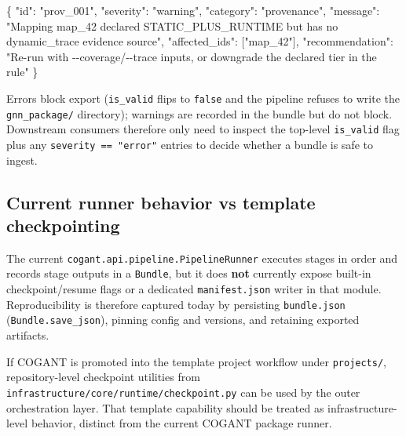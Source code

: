\documentclass[
]{article}
\newenvironment{Shaded}{}{}
\newcommand{\DataTypeTok}[1]{\textcolor[rgb]{0.56,0.13,0.00}{#1}}
\newcommand{\FunctionTok}[1]{\textcolor[rgb]{0.02,0.16,0.49}{#1}}
\newcommand{\OtherTok}[1]{\textcolor[rgb]{0.00,0.44,0.13}{#1}}
\newcommand{\StringTok}[1]{\textcolor[rgb]{0.25,0.44,0.63}{#1}}
\begin{document}
\begin{Shaded}
\begin{Highlighting}[]
\FunctionTok{\{}
  \DataTypeTok{"id"}\FunctionTok{:} \StringTok{"prov\_001"}\FunctionTok{,}
  \DataTypeTok{"severity"}\FunctionTok{:} \StringTok{"warning"}\FunctionTok{,}
  \DataTypeTok{"category"}\FunctionTok{:} \StringTok{"provenance"}\FunctionTok{,}
  \DataTypeTok{"message"}\FunctionTok{:} \StringTok{"Mapping \textquotesingle{}map\_42\textquotesingle{} declared STATIC\_PLUS\_RUNTIME but has no dynamic\_trace evidence source"}\FunctionTok{,}
  \DataTypeTok{"affected\_ids"}\FunctionTok{:} \OtherTok{[}\StringTok{"map\_42"}\OtherTok{]}\FunctionTok{,}
  \DataTypeTok{"recommendation"}\FunctionTok{:} \StringTok{"Re{-}run with {-}{-}coverage/{-}{-}trace inputs, or downgrade the declared tier in the rule"}
\FunctionTok{\}}
\end{Highlighting}
\end{Shaded}

Errors block export (\texttt{is\_valid} flips to \texttt{false} and the
pipeline refuses to write the \texttt{gnn\_package/} directory);
warnings are recorded in the bundle but do not block. Downstream
consumers therefore only need to inspect the top-level
\texttt{is\_valid} flag plus any \texttt{severity\ ==\ "error"} entries
to decide whether a bundle is safe to ingest.

\subsection{Current runner behavior vs template
checkpointing}\label{current-runner-behavior-vs-template-checkpointing}

The current \texttt{cogant.api.pipeline.PipelineRunner} executes stages
in order and records stage outputs in a \texttt{Bundle}, but it does
\textbf{not} currently expose built-in checkpoint/resume flags or a
dedicated \texttt{manifest.json} writer in that module. Reproducibility
is therefore captured today by persisting \texttt{bundle.json}
(\texttt{Bundle.save\_json}), pinning config and versions, and retaining
exported artifacts.

If COGANT is promoted into the template project workflow under
\texttt{projects/}, repository-level checkpoint utilities from
\texttt{infrastructure/core/runtime/checkpoint.py} can be used by the
outer orchestration layer. That template capability should be treated as
infrastructure-level behavior, distinct from the current COGANT package
runner.
\end{document}
